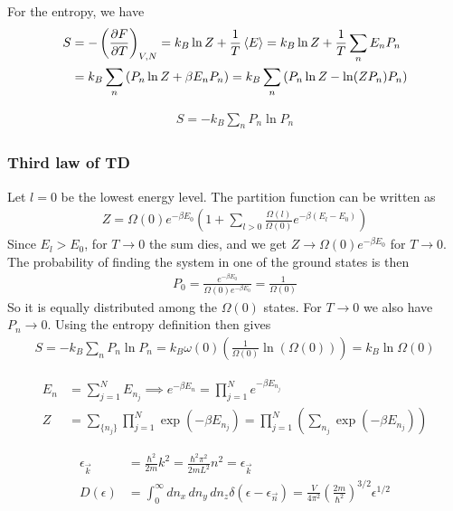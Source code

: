 \documentclass[a4paper, english, 12pt]{article}
\newcommand{\closed}[1]{\left( #1 \right)}
\newcommand{\curly}[1]{\{ #1 \} }
\begin{document}
\begin{multicols*}{2}
For the entropy, we have 
\begin{align*}
    S&=-\closed{\pdv{F}{T}}_{V,N} = k_B \ln Z + \frac{1}{T}\expval{E} = k_B \ln Z + \frac{1}{T}\sum_n E_n P_n \\ 
    &= k_B \sum_n \closed{P_n \ln Z + \beta E_n P_n} = k_B \sum_n \closed{P_n \ln Z - \ln(ZP_n) P_n}
\end{align*}


\begin{align*}
    S = -k_B \sum_n P_n \ln P_n
\end{align*}

\subsubsection*{\scriptsize Third law of TD}
Let $l=0$ be the lowest energy level. The partition function can be written as 
\begin{align*}
    Z = \Omega(0)e^{-\beta E_0} \closed{1 + \sum_{l>0} \frac{\Omega(l)}{\Omega(0)} e^{-\beta(E_l-E_0)} }    
\end{align*}
Since $E_l>E_0$, for $T\to0$ the sum dies, and we get $Z \to \Omega(0) e^{-\beta E_0}$ for $T\to0$. The probability of finding the system in one of the ground states is then 
\begin{align*}
    P_0 = \frac{e^{-\beta E_0}}{\Omega(0)e^{-\beta E_0}} = \frac{1}{\Omega(0)}
\end{align*}
So it is equally distributed among the $\Omega(0)$ states. For $T\to0$ we also have $P_n\to0$. Using the entropy definition then gives 
\begin{align*}
    S = -k_B \sum_n P_n \ln P_n = k_B \omega(0) \closed{\frac{1}{\Omega(0)}\ln(\Omega(0))} = k_B \ln\Omega(0)
\end{align*}


\begin{align*}
    E_n &= \sum_{j=1}^N E_{n_j} \implies e^{-\beta E_n} = \prod_{j=1}^N e^{-\beta E_{n_j}} \\
    Z &= \sum_{\curly{n_j}} \prod_{j=1}^N \exp(-\beta E_{n_j}) = \prod_{j=1}^N \left( \sum_{n_j} \exp(-\beta E_{n_j}) \right)
\end{align*}

\begin{align*}
    \epsilon_{\vec{k}} &= \frac{\hbar^2 }{2m}k^2 = \frac{\hbar^2 \pi^2}{2mL^2}n^2 = \epsilon_{\vec{k}} \\ 
    D(\epsilon) &= \int_0^\infty dn_x\,dn_y\,dn_z \delta(\epsilon-\epsilon_{\vec{n}}) = \frac{V}{4\pi^2} \left(\frac{2m}{\hbar^2}\right)^{3/2} \epsilon^{1/2}
\end{align*}



\end{multicols*}
\end{document}
